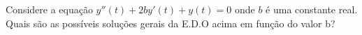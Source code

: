 \linespread{1.5}
Considere a equação $y''(t) + 2by'(t) + y(t) = 0$ onde $b$ é uma constante real. Quais são as possíveis soluções gerais da E.D.O acima em função do valor b?